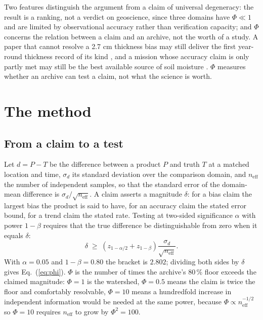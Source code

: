 \documentclass[preprint,12pt,authoryear]{elsarticle}
\begin{document}
Two features distinguish the argument from a claim of universal degeneracy: the result is a ranking, not a verdict on geoscience, since three domains have $\Phi \ll 1$ and are limited by observational accuracy rather than verification capacity; and $\Phi$ concerns the relation between a claim and an archive, not the worth of a study. A paper that cannot resolve a 2.7 cm thickness bias may still deliver the first year-round thickness record of its kind \citep{landy2022year}, and a mission whose accuracy claim is only partly met may still be the best available source of soil moisture \citep{entekhabi2010soil,colliander2017validation}. $\Phi$ measures whether an archive can test a claim, not what the science is worth.

\section{The method}
\label{sec:criterion}

\subsection{From a claim to a test}

Let $d = P - T$ be the difference between a product $P$ and truth $T$ at a matched location and time, $\sigma_d$ its standard deviation over the comparison domain, and $n_{\mathrm{eff}}$ the number of independent samples, so that the standard error of the domain-mean difference is $\sigma_d/\sqrt{n_{\mathrm{eff}}}$. A claim asserts a magnitude $\delta$: for a bias claim the largest bias the product is said to have, for an accuracy claim the stated error bound, for a trend claim the stated rate. Testing at two-sided significance $\alpha$ with power $1-\beta$ requires that the true difference be distinguishable from zero when it equals $\delta$:
\begin{equation}
\delta \;\ge\; \left(z_{1-\alpha/2}+z_{1-\beta}\right)\frac{\sigma_d}{\sqrt{n_{\mathrm{eff}}}} .
\label{eq:mde}
\end{equation}
With $\alpha = 0.05$ and $1-\beta = 0.80$ the bracket is $2.802$; dividing both sides by $\delta$ gives Eq.~(\ref{eq:phi}). $\Phi$ is the number of times the archive's 80\,\% floor exceeds the claimed magnitude: $\Phi = 1$ is the watershed, $\Phi = 0.5$ means the claim is twice the floor and comfortably resolvable, $\Phi = 10$ means a hundredfold increase in independent information would be needed at the same power, because $\Phi \propto n_{\mathrm{eff}}^{-1/2}$ so $\Phi = 10$ requires $n_{\mathrm{eff}}$ to grow by $\Phi^{2} = 100$.
\end{document}
